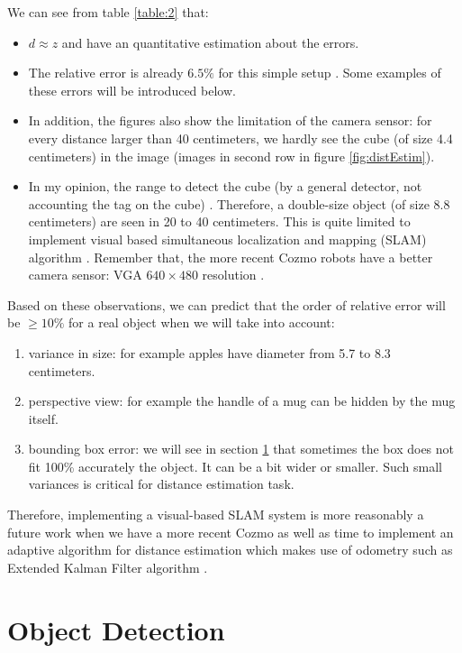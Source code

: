 We can see from table \ref{table:2} that:
\begin{itemize} 
	\item $d \approx z$ and have an quantitative estimation about the errors.
	\item The relative error is already $6.5\%$ for this simple setup . Some examples of these errors will be introduced below. 
	\item In addition, the figures also show the limitation of the camera sensor: for every distance larger than 40 centimeters, we hardly see the cube (of size 4.4 centimeters) in the image (images in second row in figure \ref{fig:distEstim}). 
	\item In my opinion, the range to detect the cube (by a general detector, not accounting the tag on the cube) . Therefore, a double-size object (of size 8.8 centimeters) are seen in 20 to 40 centimeters. This is quite limited to implement visual based simultaneous localization and mapping (SLAM) algorithm \cite{wiki:SLAM}. Remember that, the more recent Cozmo robots have a better camera sensor: VGA $640 \times 480$ resolution \cite{cozmoTech}. 
\end{itemize}

Based on these observations, we can predict that the order of relative error will be $\geq 10\%$ for a real object when we will take into account:
\begin{enumerate}
	\item variance in size: for example apples have diameter from 5.7 to 8.3 centimeters.
	\item perspective view: for example the handle of a mug can be hidden by the mug itself.
	\item bounding box error: we will see in section \ref{sec:objDetEval} that sometimes the box does not fit 100\% accurately the object. It can be a bit wider or smaller. Such small variances is critical for distance estimation task.
\end{enumerate}
Therefore, implementing a visual-based SLAM system is more reasonably a future work when we have a more recent Cozmo as well as time to implement an adaptive algorithm for distance estimation which makes use of odometry such as Extended Kalman Filter algorithm \cite{wiki:Kalman}.

\section{Object Detection}
\label{sec:objDetEval}

